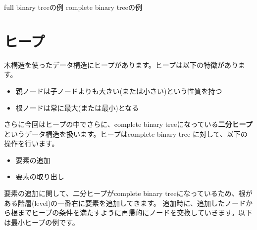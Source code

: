 \documentclass{jlreq}
\begin{document}
\hspace{1.5cm} full binary treeの例 \hspace{4.5cm} complete binary treeの例

\newpage

\section{ヒープ}
木構造を使ったデータ構造にヒープがあります。ヒープは以下の特徴があります。

\begin{itemize}
	\item 親ノードは子ノードよりも大きい(または小さい)という性質を持つ
	\item 根ノードは常に最大(または最小)となる
\end{itemize}

さらに今回はヒープの中でさらに、complete binary treeになっている\textbf{二分ヒープ}というデータ構造を扱います。ヒープはcomplete binary tree
に対して、以下の操作を行います。

\begin{itemize}
	\item 要素の追加
	\item 要素の取り出し
\end{itemize}

要素の追加に関して、二分ヒープがcomplete binary treeになっているため、根がある階層(level)の一番右に要素を追加してきます。
追加時に、追加したノードから根までヒープの条件を満たすように再帰的にノードを交換していきます。以下は最小ヒープの例です。

\vspace{1cm}
\end{document}
